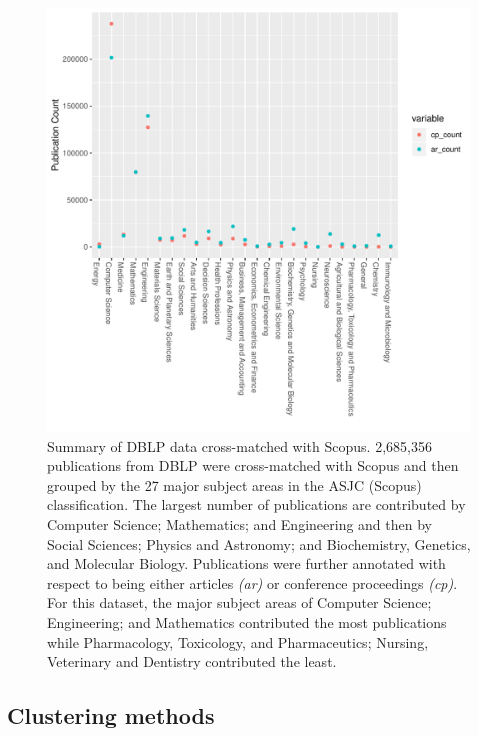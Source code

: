  \begin{figure}[ht]
\centering
  \includegraphics[scale=0.5]{ar_cp_ratio.pdf}
\caption{Summary of DBLP data cross-matched with Scopus. 2,685,356 publications from DBLP were cross-matched with Scopus and then grouped by the 27 major subject areas in the ASJC (Scopus) classification. The largest number of publications are contributed by Computer Science; Mathematics; and Engineering and then by Social Sciences; Physics and Astronomy; and Biochemistry, Genetics, and Molecular Biology. Publications were further annotated with respect to being either articles \emph{(ar)} or conference proceedings \emph{(cp)}. For this dataset, the major subject areas of Computer Science; Engineering; and Mathematics contributed the most publications while Pharmacology, Toxicology, and Pharmaceutics; Nursing, Veterinary and Dentistry contributed the least.}
\label{fig:ar_cp_annotation}       %
\end{figure}

\subsection{Clustering methods}

